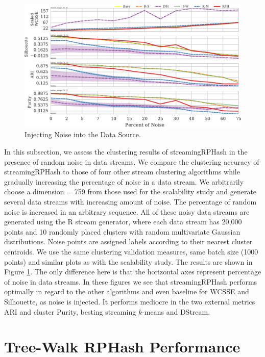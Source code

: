 \begin{figure}
  \centerline{\includegraphics[width=1.1\textwidth]{figs/d759_noise}}
  \caption{Injecting Noise into the Data Source.}\label{noise-measures}
\end{figure}

In this subsection, we assess the clustering results of \textsf{streamingRPHash} in the presence of
random noise in data streams.  We compare the clustering accuracy of \textsf{streamingRPHash} to
those of four other stream clustering algorithms while gradually increasing the percentage of noise
in a data stream.  We arbitrarily choose a dimension = 759 from those used for the scalability study
and generate several data streams with increasing amount of noise.  The percentage of random noise
is increased in an arbitrary sequence.  All of these noisy data streams are generated using the R
stream generator, where each data stream has 20,000 points and 10 randomly placed clusters with
random multivariate Gaussian distributions.  Noise points are assigned labels according to their
nearest cluster centroids.  We use the same clustering validation measures, same batch size (1000
points) and similar plots as with the scalability study.  The results are shown in Figure
\ref{noise-measures}.  The only difference here is that the horizontal axes represent percentage of
noise in data streams. In these figures we see that \textsf{streamingRPHash} performs optimally
in regard to the other algorithms and even baseline for WCSSE and Silhouette, as noise is injected. 
It performs mediocre in the two external metrics ARI and cluster Purity, besting streaming $k$-means 
and DStream.

\section{Tree-Walk RPHash Performance}

